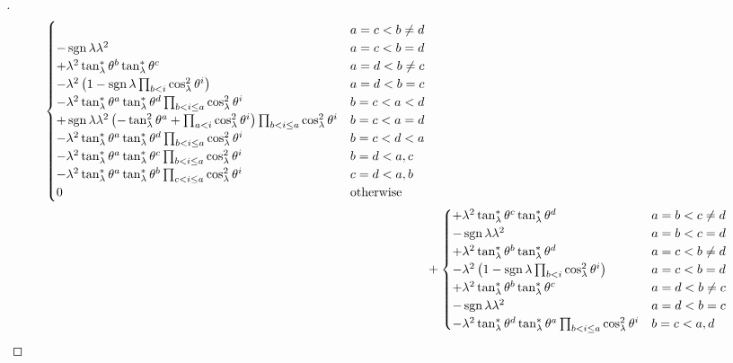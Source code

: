 \documentclass[../main.tex]{subfiles}
\begin{document}
\begin{proof}[]
\begin{align*}
\begin{cases}
&\text{\(a=c<b\ne d\)}\\
-\sign{\lambda}\lambda^2
&\text{\(a=c<b=d\)}\\
+\lambda^2\tan_\lambda^\ast\tensor{\theta}{^b}\tan_\lambda^\ast\tensor{\theta}{^c}
&\text{\(a=d<b\ne c\)}\\
-\lambda^2
\left(
1
-\sign{\lambda}\prod_{b<i}\cos_\lambda^2\tensor{\theta}{^i}
\right)
&\text{\(a=d<b=c\)}\\
-\lambda^2\tan_\lambda^\ast\tensor{\theta}{^a}\tan_\lambda^\ast\tensor{\theta}{^d}\prod_{b<i\le a}\cos_\lambda^2\tensor{\theta}{^i}
&\text{\(b=c<a<d\)}\\
+\sign{\lambda}\lambda^2
\left(
-\tan_\lambda^2\tensor{\theta}{^a}
+\prod_{a<i}\cos_\lambda^2\tensor{\theta}{^i}
\right)
\prod_{b<i\le a}\cos_\lambda^2\tensor{\theta}{^i}
&\text{\(b=c<a=d\)}\\
-\lambda^2\tan_\lambda^\ast\tensor{\theta}{^a}\tan_\lambda^\ast\tensor{\theta}{^d}\prod_{b<i\le a}{\cos_\lambda^2\tensor{\theta}{^i}}
&\text{\(b=c<d<a\)}\\
-\lambda^2\tan_\lambda^\ast\tensor{\theta}{^a}\tan_\lambda^\ast\tensor{\theta}{^c}\prod_{b<i\le a}\cos_\lambda^2\tensor{\theta}{^i}
&\text{\(b=d<a,c\)}\\
-\lambda^2\tan_\lambda^\ast\tensor{\theta}{^a}\tan_\lambda^\ast\tensor{\theta}{^b}\prod_{c<i\le a}\cos_\lambda^2\tensor{\theta}{^i}
&\text{\(c=d<a,b\)}\\
0&\text{otherwise}\\
\end{cases}\\
&+\begin{cases}
+\lambda^2\tan_\lambda^\ast\tensor{\theta}{^c}\tan_\lambda^\ast\tensor{\theta}{^d}
&\text{\(a=b<c\ne d\)}\\
-\sign{\lambda}\lambda^2
&\text{\(a=b<c=d\)}\\
+\lambda^2\tan_\lambda^\ast\tensor{\theta}{^b}\tan_\lambda^\ast\tensor{\theta}{^d}
&\text{\(a=c<b\ne d\)}\\
-\lambda^2
\left(
1
-\sign{\lambda}\prod_{b<i}\cos_\lambda^2\tensor{\theta}{^i}
\right)
&\text{\(a=c<b=d\)}\\
+\lambda^2\tan_\lambda^\ast\tensor{\theta}{^b}\tan_\lambda^\ast\tensor{\theta}{^c}
&\text{\(a=d<b\ne c\)}\\
-\sign{\lambda}\lambda^2
&\text{\(a=d<b=c\)}\\
-\lambda^2\tan_\lambda^\ast\tensor{\theta}{^d}\tan_\lambda^\ast\tensor{\theta}{^a}\prod_{b<i\le a}\cos_\lambda^2\tensor{\theta}{^i}
&\text{\(b=c<a,d\)}\\

\end{cases}
\end{align*}
\end{proof}
\end{document}
